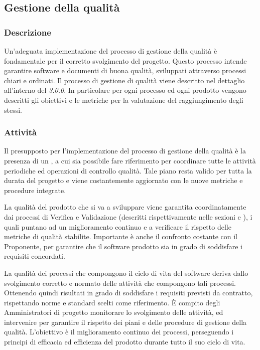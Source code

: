 \subsection{Gestione della qualità}
    \subsubsection{Descrizione}
      Un'adeguata implementazione del processo di gestione della qualità è fondamentale per il corretto svolgimento del progetto. Questo processo intende garantire software e documenti di buona qualità, sviluppati attraverso processi chiari e ordinati. Il processo di gestione di qualità viene descritto nel dettaglio all'interno del \textit{\PdQ{} 3.0.0}. In particolare per ogni processo ed ogni prodotto vengono descritti gli obiettivi e le metriche per la valutazione del raggiungimento degli stessi.
      
    \subsubsection{Attività}
       Il presupposto per l'implementazione del processo di gestione della qualità è la presenza di un \PdQ{}, a cui sia possibile fare riferimento per coordinare tutte le attività periodiche ed operazioni di controllo qualità. Tale piano resta valido per tutta la durata del progetto e viene costantemente aggiornato con le nuove metriche e procedure integrate.

      La qualità del prodotto che si va a sviluppare viene garantita coordinatamente dai processi di Verifica e Validazione (descritti rispettivamente nelle sezioni  e ), i quali puntano ad un miglioramento continuo e a verificare il rispetto delle metriche di qualità stabilite. Importante è anche il confronto costante con il Proponente, per garantire che il software prodotto sia in grado di soddisfare i requisiti concordati.

      La qualità dei processi che compongono il ciclo di vita del software deriva dallo svolgimento corretto e normato delle attività che compongono tali processi. Ottenendo quindi risultati in grado di soddisfare i requisiti previsti da contratto, rispettando norme e standard scelti come riferimento. È compito degli Amministratori di progetto monitorare lo svolgimento delle attività, ed intervenire per garantire il rispetto dei piani e delle procedure di gestione della qualità.
      L'obiettivo è il miglioramento continuo dei processi, perseguendo i principi di efficacia ed efficienza del prodotto durante tutto il suo ciclo di vita.   
	
